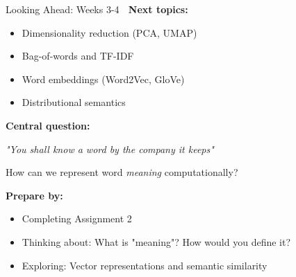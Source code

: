 \documentclass[aspectratio=169]{beamer}
\begin{document}
\begin{frame}[shrink=10]{Looking Ahead: Weeks 3-4 🔮}
    \textbf{Next topics:}
    \begin{itemize}\setlength{\itemsep}{0pt}
        \item Dimensionality reduction (PCA, UMAP)
        \item Bag-of-words and TF-IDF
        \item Word embeddings (Word2Vec, GloVe)
        \item Distributional semantics
    \end{itemize}

    \vspace{1em}
    \textbf{Central question:}
    \begin{center}
        \textit{"You shall know a word by the company it keeps"}
    \end{center}

    How can we represent word \textit{meaning} computationally?

    \vspace{1em}
    \textbf{Prepare by:}
    \begin{itemize}\setlength{\itemsep}{0pt}
        \item Completing Assignment 2
        \item Thinking about: What is "meaning"? How would you define it?
        \item Exploring: Vector representations and semantic similarity
    \end{itemize}
\end{frame}
\end{document}
